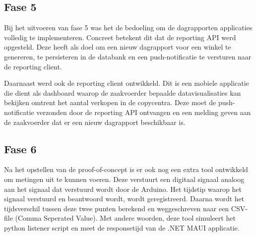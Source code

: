 \subsection{Fase 5}
Bij het uitvoeren van fase 5 was het de bedoeling om de dagrapporten applicaties volledig te implementeren. Concreet betekent dit dat de reporting API werd opgesteld. Deze heeft als doel om een nieuw dagrapport voor een winkel te genereren, te persisteren in de databank en een push-notificatie te versturen naar de reporting client.

Daarnaast werd ook de reporting client ontwikkeld. Dit is een mobiele applicatie die dient als dashboard waarop de zaakvoerder bepaalde datavisualisaties kan bekijken omtrent het aantal verkopen in de copycentra. Deze moet de push-notificatie verzonden door de reporting API ontvangen en een melding geven aan de zaakvoerder dat er een nieuw dagrapport beschikbaar is.

\subsection{Fase 6}
Na het opstellen van de proof-of-concept is er ook nog een extra tool ontwikkeld om metingen uit te kunnen voeren. Deze verstuurt een digitaal signaal analoog aan het signaal dat verstuurd wordt door de Arduino. Het tijdstip waarop het signaal verstuurd en beantwoord wordt, wordt geregistreerd. Daarna wordt het tijdsverschil tussen deze twee punten berekend en weggeschreven naar een CSV-file (Comma Seperated Value). Met andere woorden, deze tool simuleert het python listener script en meet de responsetijd van de .NET MAUI applicatie.